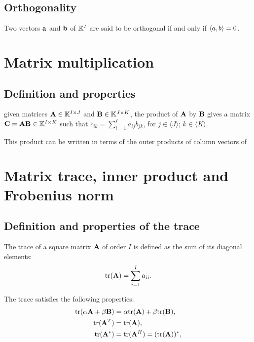 \subsection{Orthogonality}
\begin{definition}{}{}
    Two vectors $\bold{a}$ and $\bold{b}$ of $\mathbb{K}^{I}$ are said to be 
    orthogonal if and only if $\langle a,b\rangle=0$. 
\end{definition}


\section{Matrix multiplication}
\subsection{Definition and properties}

given matrices $\bold{A}\in \mathbb{K}^{I\times J}$ and
$\bold{B}\in \mathbb{K}^{J\times K}$,
the product of $\bold{A}$ by $\bold{B}$
gives a matrix $\bold{C}=\bold{AB}\in\mathbb{K}^{I\times K}$
such that $c_{ik}=\sum\limits_{i=1}^{I}a_{ij}b_{jk}$,
for $j\in \langle J\rangle$; $k\in \langle K\rangle$.
\par
This product can be written in terms of the outer products of column vectors of 




\section{Matrix trace, inner product and Frobenius norm}

\subsection{Definition and properties of the trace}
\begin{definition}{}{}
    The trace of a square matrix $\bold{A}$ of order $I$ is defined as the sum of its diagonal elements:
    \begin{align*}
        \text{tr}(\bold{A})=\sum\limits_{i=1}^{I}a_{ii}.
    \end{align*}
\end{definition}

\begin{proposition}{}{}
    The trace satisfies the following properties:
    \begin{align*}
        \text{tr}(\alpha \bold{A}+\beta \bold{B}) &= \alpha \text{tr}(\bold{A}) + \beta \text{tr}(\bold{B}),\\
        \text{tr}(\bold{A}^T)&=\text{tr}(\bold{A}),\\
        \text{tr}(\bold{A}^*)&=\text{tr}(\bold{A}^H)=(\text{tr}(\bold{A}))^*,\\
    \end{align*}
\end{proposition}

